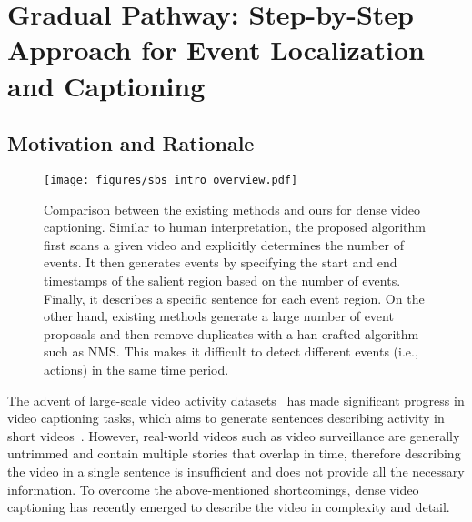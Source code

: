 
\chapter{Gradual Pathway: Step-by-Step Approach for Event Localization and Captioning}
\label{chap:gradual_pathway}

\section{Motivation and Rationale}

\begin{figure*}[t]
  \centering
  \texttt{[image: figures/sbs\_intro\_overview.pdf]}
  \caption{
    Comparison between the existing methods and ours for dense video captioning.
    Similar to human interpretation, the proposed algorithm first scans a given video and explicitly determines the number of events.
    It then generates events by specifying the start and end timestamps of the salient region based on the number of events.
    Finally, it describes a specific sentence for each event region.
    On the other hand, existing methods generate a large number of event proposals and then remove duplicates with a han-crafted algorithm such as NMS.\@
    This makes it difficult to detect different events (i.e., actions) in the same time period.
  }
  \label{fig:intro_overview}
\end{figure*}
The advent of large-scale video activity datasets~\cite{karpathy2014large,caba2015activitynet,kay2017kinetics} has made significant progress in video captioning tasks, which aims to generate sentences describing activity in short videos~\cite{venugopalan2015sequence,venugopalan2015translating,yao2015describing,pan2016hierarchical,pan2016jointly,baraldi2017hierarchical,gan2017semantic,pan2017video,yu2017end,wang2018reconstruction,zhu2020understanding,bhooshan2022multimodal,li2022adaptive}.
However, real-world videos such as video surveillance are generally untrimmed and contain multiple stories that overlap in time, therefore describing the video in a single sentence is insufficient and does not provide all the necessary information.
To overcome the above-mentioned shortcomings, dense video captioning has recently emerged to describe the video in complexity and detail.

